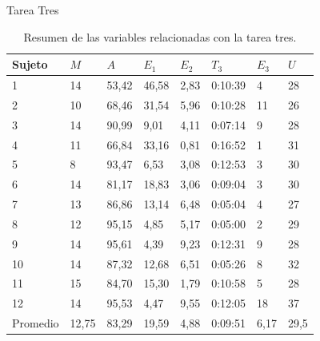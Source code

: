 \begin{frame}{Tarea Tres}
\begin{table}[H]
\centering
\footnotesize
\begin{tabular}{|p{1.2cm}|p{0.7cm}|p{0.8cm}|p{0.8cm}|p{1.0cm}|p{1.0cm}|p{0.7cm}|p{0.7cm}|}
\hline
    Sujeto & $M$ &  $A$     & $E_1$    & $E_2$   & $T_3$      & $E_3$  & $U$ \\
    \hline 
    1  & 14  & 53,42  & 46,58  & 2,83 & 0:10:39 & 4  &  28 \\
    2  & 10  & 68,46  & 31,54  & 5,96 & 0:10:28 & 11 &  26 \\
    3  & 14  & 90,99  & 9,01   & 4,11 & 0:07:14 & 9  &  28 \\
    4  & 11  & 66,84  & 33,16  & 0,81 & 0:16:52 & 1  &  31 \\
    5  & 8   & 93,47  & 6,53   & 3,08 & 0:12:53 & 3  &  30 \\
    6  & 14  & 81,17  & 18,83  & 3,06 & 0:09:04 & 3  &  30 \\
    7  & 13  & 86,86  & 13,14  & 6,48 & 0:05:04 & 4  &  27 \\
    8  & 12  & 95,15  & 4,85   & 5,17 & 0:05:00 & 2  &  29 \\
    9  & 14  & 95,61  & 4,39   & 9,23 & 0:12:31 & 9  &  28 \\
    10 & 14  & 87,32  & 12,68  & 6,51 & 0:05:26 & 8  &  32 \\
    11 & 15  & 84,70  & 15,30  & 1,79 & 0:10:58 & 5  &  28 \\
    12 & 14  & 95,53  & 4,47   & 9,55 & 0:12:05 & 18 &  37 \\
\hline
  Promedio & 12,75 & 83,29   & 19,59 & 4,88 & 0:09:51 & 6,17 & 29,5   \\
\hline
\end{tabular}
\caption{Resumen de las variables relacionadas con la tarea tres.}
\label{sec:tabla-tarea3}
\end{table}
\end{frame}

